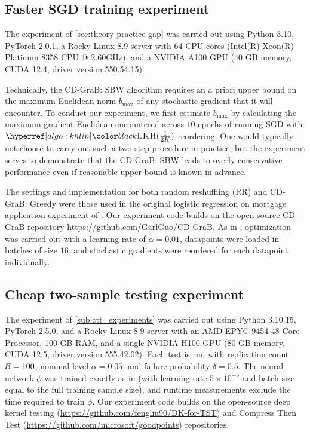 %
\subsection{Faster SGD training experiment}
\label{app:sgd_details}
The experiment of \cref{sec:theory-practice-gap} was carried out using Python 3.10, PyTorch 2.0.1, a Rocky Linux 8.9 server with 64 CPU cores (Intel(R) Xeon(R) Platinum 8358 CPU @ 2.60GHz), and a NVIDIA A100 GPU (40 GB memory, CUDA 12.4, driver version 550.54.15). 

Technically, the CD-GraB: SBW algorithm requires an a priori upper bound on the maximum Euclidean norm $b_{\max}$ of any stochastic gradient that it will encounter.  
To conduct our experiment, we first estimate $b_{\max}$ by calculating the maximum gradient Euclidean encountered across $10$ epochs of running SGD with $\khsgd$ reordering.
One would typically not choose to carry out such a two-step procedure in practice, but the experiment serves to demonstrate that the CD-GraB: SBW leads to overly conservative performance even if reasonable upper bound is known in advance.

 
The settings and implementation for both random reshuffling (RR) and CD-GraB: Greedy were those used in the original logistic regression on mortgage application experiment of  \citet{cooper2023coordinatingdistributedexampleorders}.
Our experiment code builds on the open-source CD-GraB repository \url{https://github.com/GarlGuo/CD-GraB}.
As in \citet{cooper2023coordinatingdistributedexampleorders}, optimization was carried out with a learning rate of $\alpha=0.01$, datapoints were loaded in batches of size $16$, and stochastic gradients were reordered for each datapoint individually.

%
\subsection{Cheap two-sample testing experiment}
\label{app:testing_details}

The experiment of \cref{sub:ctt_experiments} was carried out using Python 3.10.15, PyTorch 2.5.0, and a Rocky Linux 8.9 server with an AMD EPYC 9454 48-Core Processor, 100 GB RAM, and a single NVIDIA H100 GPU (80 GB memory, CUDA 12.5, driver version 555.42.02). Each test is run with replication count $\mathcal{B}=100$, nominal level $\alpha=0.05$, and failure probability $\delta=0.5$.
The neural network $\phi$ was trained exactly as in \citet{liu2020learning} (with learning rate $5\times10^{-5}$ and batch size equal to the full training sample size), and
runtime measurements exclude the time required to train $\phi$.
Our experiment code builds on the open-source deep kernel testing 
(\url{https://github.com/fengliu90/DK-for-TST}) and Compress Then Test
(\url{https://github.com/microsoft/goodpoints}) repositories.